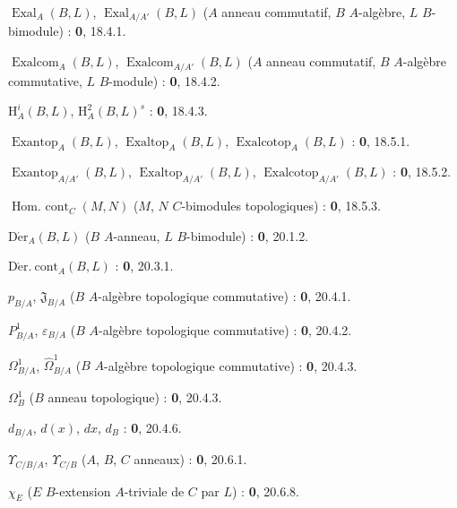 $\operatorname{Exal}_A(B,L)$, $\operatorname{Exal}_{A/A'}(B,L)$ ($A$ anneau commutatif, $B$ $A$-algèbre, $L$ $B$-bimodule) : \textbf{0}, 18.4.1.\par
$\operatorname{Exalcom}_A(B,L)$, $\operatorname{Exalcom}_{A/A'}(B,L)$ ($A$ anneau commutatif, $B$ $A$-algèbre commutative, $L$ $B$-module) : \textbf{0}, 18.4.2.\par
$\mathrm H_A^i(B,L)$, $\mathrm H_A^2(B,L)^s$ : \textbf{0}, 18.4.3.\par
$\operatorname{Exantop}_A(B,L)$, $\operatorname{Exaltop}_A(B,L)$,
$\operatorname{Exalcotop}_A(B,L)$ : \textbf{0}, 18.5.1.\par
$\operatorname{Exantop}_{A/A'}(B,L)$, $\operatorname{Exaltop}_{A/A'}(B,L)$,
$\operatorname{Exalcotop}_{A/A'}(B,L)$ : \textbf{0}, 18.5.2.\par
$\operatorname{Hom.\ cont}_C(M,N)$ ($M$, $N$ $C$-bimodules topologiques) : \textbf{0}, 18.5.3.\par
$\operatorname{D\acute{e}r}_A(B,L)$ ($B$ $A$-anneau, $L$ $B$-bimodule) : \textbf{0}, 20.1.2.\par
$\operatorname{D\acute{e}r.\ cont}_A(B,L)$ : \textbf{0}, 20.3.1.\par
$p_{B/A}$, $\mathfrak J_{B/A}$ ($B$ $A$-algèbre topologique commutative) : \textbf{0}, 20.4.1.\par
$P^1_{B/A}$, $\varepsilon_{B/A}$ ($B$ $A$-algèbre topologique commutative) : \textbf{0}, 20.4.2.\par
$\Omega^1_{B/A}$, $\widehat{\Omega}^1_{B/A}$ ($B$ $A$-algèbre topologique commutative) : \textbf{0}, 20.4.3.\par
$\Omega^1_B$ ($B$ anneau topologique) : \textbf{0}, 20.4.3.\par
$d_{B/A}$, $d(x)$, $dx$, $d_B$ : \textbf{0}, 20.4.6.\par
$\Upsilon_{C/B/A}$, $\Upsilon_{C/B}$ ($A$, $B$, $C$ anneaux) : \textbf{0}, 20.6.1.\par
$\chi_E$ ($E$ $B$-extension $A$-triviale de $C$ par $L$) : \textbf{0}, 20.6.8.\par

